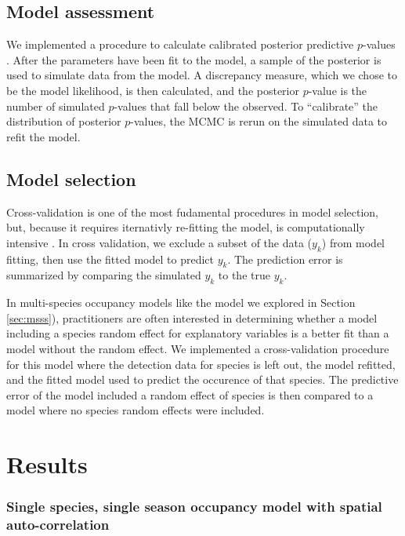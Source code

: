 \documentclass[12pt]{article}
\begin{document}
\subsection*{Model assessment}
\label{sec:assess}

We implemented a procedure to calculate calibrated posterior
predictive $p$-values \citep{hjort-etal-06}. After the parameters have
been fit to the model, a sample of the posterior is used to simulate
data from the model. A discrepancy measure, which we chose to be the
model likelihood, is then calculated, and the posterior $p$-value is
the number of simulated $p$-values that fall below the observed. To
``calibrate'' the distribution of posterior $p$-values, the MCMC is
rerun on the simulated data to refit the model. 

\subsection*{Model selection}
\label{sec:select}

Cross-validation is one of the most fudamental procedures in model
selection, but, because it requires iternativly re-fitting the model,
is computationally intensive \citep{hooten2014guide}. In cross
validation, we exclude a subset of the data ($y_k$) from model
fitting, then use the fitted model to predict $y_k$. The prediction
error is summarized by comparing the simulated $y_k$ to the true
$y_k$.

In multi-species occupancy models like the model we explored in
Section \ref{sec:msss}), practitioners are often interested in
determining whether a model including a species random effect for
explanatory variables is a better fit than a model without the random
effect. We implemented a cross-validation procedure for this model
where the detection data for species is left out, the model refitted,
and the fitted model used to predict the occurence of that
species. The predictive error of the model included a random effect of
species is then compared to a model where no species random effects
were included.

\section*{Results}
\label{sec:results}
\subsubsection*{Single species, single season occupancy model with
  spatial auto-correlation}
\end{document}
